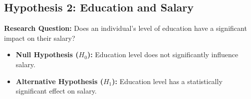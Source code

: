 
\subsection{Hypothesis 2: Education and Salary}
\textbf{Research Question:} Does an individual's level of education have a significant impact on their salary?

\begin{itemize}
    \item \textbf{Null Hypothesis ($H_0$):} Education level does not significantly influence salary.
    \item \textbf{Alternative Hypothesis ($H_1$):} Education level has a statistically significant effect on salary.
\end{itemize}
